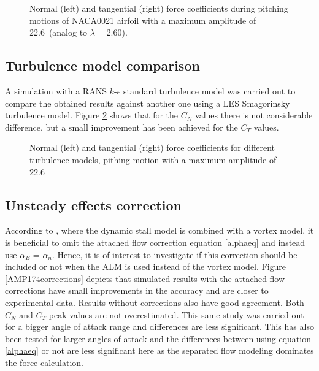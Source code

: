 \documentclass[a4paper]{jpconf}
\begin{document}
\begin{figure}[h]
\begin{minipage}{18pc}
\resizebox{\columnwidth}{!}{}
\end{minipage}\hspace{2pc}%
\begin{minipage}{18pc}
\resizebox{\columnwidth}{!}{}
\end{minipage}
\caption{\label{fig226}Normal (left) and tangential (right) force coefficients during pitching motions of NACA0021 airfoil with a maximum amplitude of 22.6\degree\ (analog to $\lambda = 2.60$).}
\end{figure}

\subsection{Turbulence model comparison}
A simulation with a RANS $k$-$\epsilon$ standard turbulence model was carried out to compare the obtained results against another one using a LES Smagorinsky turbulence model. Figure \ref{RANSLES} shows that for the $C_N$ values there is not considerable difference, but a small improvement has been achieved for the $C_T$ values.

\begin{figure}[h]
\begin{minipage}{18pc}
\resizebox{\columnwidth}{!}{}
\end{minipage}\hspace{2pc}%
\begin{minipage}{18pc}
\resizebox{\columnwidth}{!}{}
\end{minipage}
\caption{\label{RANSLES}Normal (left) and tangential (right) force coefficients for different turbulence models, pithing motion with a maximum amplitude of 22.6\degree\ }
\end{figure}

\subsection{Unsteady effects correction}


According to \cite{dyachuk2015simulating}, where the dynamic stall model is combined with a vortex model, it is beneficial to omit the attached flow correction equation \ref{alphaeq} and instead use $\alpha_E$ = $\alpha_n$. Hence, it is of interest to investigate if this correction should be included or not when the ALM is used instead of the vortex model. Figure \ref{AMP174corrections} depicts that simulated results with the attached flow corrections have small improvements in the accuracy and are closer to experimental data. Results without corrections also have good agreement. Both $C_N$ and $C_T$ peak values are not overestimated.  This same study was carried out for a bigger angle of attack range and differences are less significant.        This has also been tested for larger angles of attack and the differences between using equation \ref{alphaeq} or not are less significant here as the separated flow modeling dominates the force calculation.  
\end{document}
